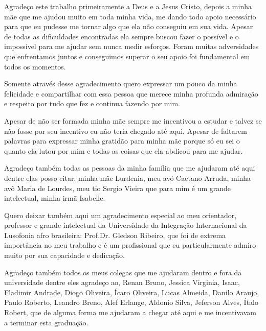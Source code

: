 \documentclass[pnumabnt,normaltoc,espacoumemeio,capchap]{abnt}
\begin{document}
\capa
\folhaderosto
\makecippage
\termodeaprovacao

\makededicatoria

Agradeço este trabalho primeiramente a Deus e a Jesus Cristo, depois a minha mãe que me ajudou 
muito em toda minha vida, me dando todo apoio necessário para que eu pudesse me tornar algo que 
ela não conseguiu em sua vida. Apesar de todas as dificuldades encontradas ela sempre buscou 
fazer o possível e o impossível para me ajudar sem nunca medir esforços. Foram muitas adversidades 
que enfrentamos juntos e conseguimos superar o seu apoio foi fundamental em todos os momentos.

Somente através desse agradecimento quero expressar um pouco da minha felicidade e compartilhar 
com essa pessoa que merece minha profunda admiração e respeito por tudo que fez e continua fazendo por mim.

Apesar de não ser formada minha mãe sempre me incentivou a estudar e talvez se não fosse por seu 
incentivo eu não teria chegado até aqui. Apesar de faltarem palavras para expressar minha gratidão 
para minha mãe porque só eu sei o quanto ela lutou por mim e todas as coisas que ela abdicou para me ajudar.

Agradeço também todas as pessoas da minha família que me ajudaram até aqui dentre elas posso citar: 
minha mãe Lurdenia, meu avó Caetano Arruda, minha avô Maria de Lourdes, meu tio Sergio Vieira que 
para mim é um grande intelectual, minha irmã Isabelle.

Quero deixar também aqui um agradecimento especial ao meu orientador, professor e grande intelectual 
da Universidade da Integração Internacional da Lusofonia afro brasileira: Prof.Dr. Gledson Ribeiro, que 
foi de extrema importância no meu trabalho e é um profissional que eu particularmente admiro muito 
por sua capacidade e dedicação.

Agradeço também todos os meus colegas que me ajudaram dentro e fora da universidade dentre eles agradeço 
ao, Renan Bruno, Jessica Virginia, Isaac, Fladimir Andrade, Diogo Oliveira, Ícaro Oliveira, Lucas Almeida, 
Danilo Araujo, Paulo Roberto, Leandro Breno, Alef Erlange, Aldonio Silva, Jeferson Alves, Ítalo Robert, 
que de alguma forma me ajudaram a chegar até aqui e me incentivavam a terminar esta graduação.

\pagebreak


\tableofcontents









%
\end{document}
